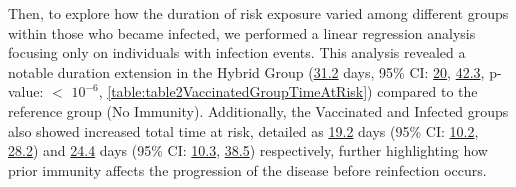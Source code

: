 \documentclass[11pt]{article}
\begin{document}
Then, to explore how the duration of risk exposure varied among different groups within those who became infected, we performed a linear regression analysis focusing only on individuals with infection events. This analysis revealed a notable duration extension in the Hybrid Group (\hyperlink{B4a}{31.2} days, 95\% CI: \hyperlink{B4e}{20}, \hyperlink{B4f}{42.3}, p-value: $<$ \hyperlink{B4d}{$10^{-6}$}, \ref{table:table2VaccinatedGroupTimeAtRisk}) compared to the reference group (No Immunity). Additionally, the Vaccinated and Infected groups also showed increased total time at risk, detailed as \hyperlink{B2a}{19.2} days (95\% CI: \hyperlink{B2e}{10.2}, \hyperlink{B2f}{28.2}) and \hyperlink{B3a}{24.4} days (95\% CI: \hyperlink{B3e}{10.3}, \hyperlink{B3f}{38.5}) respectively, further highlighting how prior immunity affects the progression of the disease before reinfection occurs.
\end{document}

